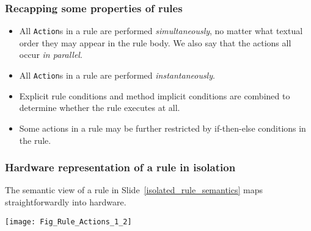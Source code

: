 \begin{frame}[fragile]
\frametitle{Recapping some properties of rules}

\footnotesize

\begin{itemize}

 \item All {\tt Action}s in a rule are
       performed \emph{simultaneously}, no matter what textual order
       they may appear in the rule body.  We also say that the actions
       all occur \emph{in parallel}.

 \item All {\tt Action}s in a rule are performed
       \emph{instantaneously}.

 \item Explicit rule conditions and method implicit conditions are
       combined to determine whether the rule executes at all.

 \item Some actions in a rule may be further restricted by
       if-then-else conditions in the rule.

\end{itemize}

\end{frame}


\begin{frame}[fragile]
\frametitle{Hardware representation of a rule in isolation}

\label{Slide_HW_representation_of_a_rule}

\footnotesize

The semantic view of a rule in Slide~\ref{isolated_rule_semantics}
maps straightforwardly into hardware.

\vspace{5ex}

\begin{center}
 \texttt{[image: Fig\_Rule\_Actions\_1\_2]}
\end{center}

\end{frame}



